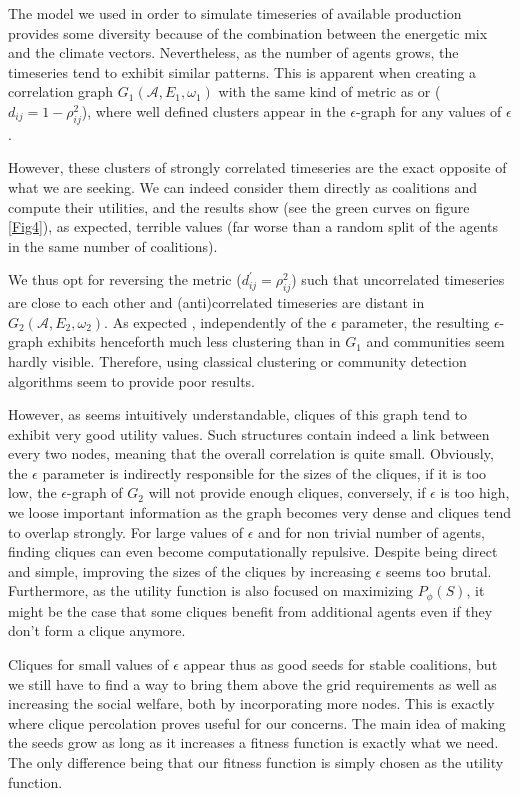 \documentclass[conference]{IEEEtran}
\begin{document}
The model we used in order to simulate timeseries of available production provides some diversity because of the combination between the energetic mix and the climate vectors. Nevertheless, as the number of agents grows, the timeseries tend to exhibit similar patterns. This is apparent when creating a correlation graph $ G_{1}(\mathcal{A},E_{1},\omega_{1}) $ with the same kind of metric as \cite{Garas2008} or \cite{Onnela2004} ($ d_{ij} = 1 - \rho_{ij}^{2} $), where well defined clusters appear in the $ \epsilon $-graph for any values of $ \epsilon $. 

However, these clusters of strongly correlated timeseries are the exact opposite of what we are seeking. We can indeed consider them directly as coalitions and compute their utilities, and the results show (see the green curves on figure \ref{Fig4}), as expected, terrible values (far worse than a random split of the agents in the same number of coalitions).

We thus opt for reversing the metric ($ d_{ij}^{'} = \rho_{ij}^{2} $) such that uncorrelated timeseries are close to each other and (anti)correlated timeseries are distant in $ G_{2}(\mathcal{A},E_{2},\omega_{2}) $. As expected \cite{Onnela2004}, independently of the $ \epsilon $ parameter, the resulting $ \epsilon $-graph exhibits henceforth much less clustering than in $ G_{1} $ and communities seem hardly visible. Therefore, using classical clustering or community detection algorithms seem to provide poor results. 

However, as seems intuitively understandable, cliques of this graph tend to exhibit very good utility values. Such  structures contain indeed a link between every two nodes, meaning that the overall correlation is quite small. Obviously, the $ \epsilon $ parameter is indirectly responsible for the sizes of the cliques, if it is too low, the $\epsilon$-graph of $ G_{2} $ will not provide enough cliques, conversely, if $\epsilon $ is too high, we loose important information as the graph becomes very dense and cliques tend to overlap strongly. For large values of $ \epsilon $ and for non trivial number of agents, finding cliques can even become computationally repulsive. Despite being direct and simple, improving the sizes of the cliques by increasing $ \epsilon $ seems too brutal. Furthermore, as the utility function is also focused on maximizing $ P_{\phi}(S) $, it might be the case that some cliques benefit from additional agents even if they don't form a clique anymore.

Cliques for small values of $ \epsilon $ appear thus as good seeds for stable coalitions, but we still have to find a way to bring them above the grid requirements as well as increasing the social welfare, both by incorporating more nodes. This is exactly where clique percolation proves useful for our concerns. The main idea of making the seeds grow as long as it increases a fitness function is exactly what we need. The only difference being that our fitness function is simply chosen as the utility function.  
\end{document}
